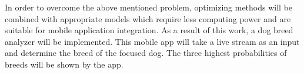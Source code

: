 In order to overcome the above mentioned problem, optimizing methods will be combined with appropriate models which require less computing power and are suitable for mobile application integration. As a result of this work, a dog breed analyzer will be implemented. This mobile app will take a live stream as an input and determine the breed of the focused dog. The three highest probabilities of breeds will be shown by the app.
	